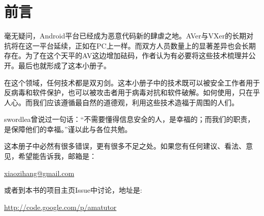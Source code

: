 \chapter{前言}
毫无疑问，Android平台已经成为恶意代码新的肆虐之地。AVer与VXer的长期对抗将在这一平台延续，正如在PC上一样。而双方人员数量上的显著差异也会长期存在。为了在这个天平的AV这边增加砝码，作者认为有必要将这些技术梳理并公开。最后也就形成了这本小册子。

在这个领域，任何技术都是双刃剑。这本小册子中的技术既可以被安全工作者用于反病毒和软件保护，也可以被攻击者用于病毒对抗和软件破解。如何使用，只在乎人心。而我们应该遵循最自然的道德观，利用这些技术造福于周围的人们。

swordlea曾说过一句话：“不需要懂得信息安全的人，是幸福的；而我们的职责，是保障他们的幸福。”谨以此与各位共勉。

这本册子中必然有很多错误，更有很多不足之处。如果您有任何建议、看法、意见，希望能告诉我，邮箱是：

\begin{center}
\href{mailto:xiaozihang@gmail.com}{xiaozihang@gmail.com}
\end{center}

或者到本书的项目主页Issue中讨论，地址是:

\begin{center}\href{http://code.google.com/p/amatutor}{http://code.google.com/p/amatutor}
\end{center}
